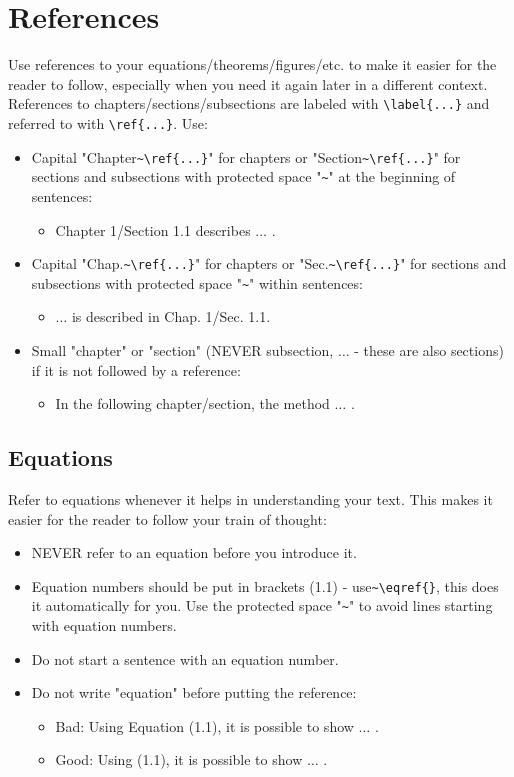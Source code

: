 \section{References}

Use references to your equations/theorems/figures/etc. to make it easier for the reader to follow, especially when you need it again later in a different context.
References to chapters/sections/subsections are labeled with \verb|\label{...}| and referred to with \verb|\ref{...}|. Use:

\begin{itemize}
	\item Capital "Chapter\verb|~\ref{...}|" for chapters or "Section\verb|~\ref{...}|" for sections and subsections with protected space "\verb|~|" at the beginning of sentences:
	\begin{itemize}
		\item Chapter 1/Section 1.1 describes $\ldots$ .
	\end{itemize}
	\item Capital "Chap.\verb|~\ref{...}|" for chapters or "Sec.\verb|~\ref{...}|" for sections and subsections with protected space "\verb|~|" within sentences:
	\begin{itemize}
		\item $\ldots$ is described in Chap. 1/Sec. 1.1.
	\end{itemize}
	\item Small "chapter" or "section" (NEVER subsection, $\ldots$ - these are also sections) if it is not followed by a reference:
	\begin{itemize}
		\item In the following chapter/section, the method $\ldots$ .
	\end{itemize}
\end{itemize}

\subsection{Equations}
Refer to equations whenever it helps in understanding your text. This makes it easier for the reader to follow your train of thought:
\begin{itemize}
	\item NEVER refer to an equation before you introduce it.
	\item Equation numbers should be put in brackets (1.1) - use\verb|~\eqref{}|, this does it automatically for you. Use the protected space "\verb|~|" to avoid lines starting with equation numbers.
	\item Do not start a sentence with an equation number.
	\item Do not write "equation" before putting the reference:
	\begin{itemize}
		\item Bad: Using Equation (1.1), it is possible to show $\ldots$ .
		\item Good: Using (1.1), it is possible to show $\ldots$ .
	\end{itemize}
\end{itemize}

